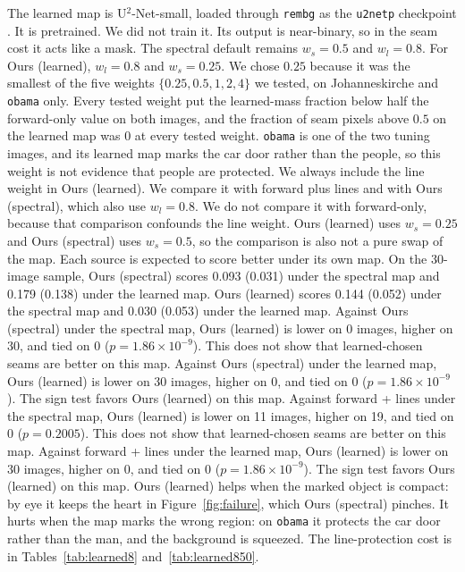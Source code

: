 \documentclass[10pt,twocolumn,letterpaper]{article}
\begin{document}
The learned map is U$^2$-Net-small, loaded through \texttt{rembg} as the \texttt{u2netp} checkpoint \cite{qin2020u2net}.
It is pretrained. We did not train it.
Its output is near-binary, so in the seam cost it acts like a mask.
The spectral default remains $w_s = 0.5$ and $w_l = 0.8$.
For Ours (learned), $w_l = 0.8$ and $w_s = 0.25$.
We chose $0.25$ because it was the smallest of the five weights $\{0.25, 0.5, 1, 2, 4\}$ we tested, on Johanneskirche and \texttt{obama} only.
Every tested weight put the learned-mass fraction below half the forward-only value on both images, and the fraction of seam pixels above $0.5$ on the learned map was 0 at every tested weight.
\texttt{obama} is one of the two tuning images, and its learned map marks the car door rather than the people, so this weight is not evidence that people are protected.
We always include the line weight in Ours (learned).
We compare it with forward plus lines and with Ours (spectral), which also use $w_l = 0.8$.
We do not compare it with forward-only, because that comparison confounds the line weight.
Ours (learned) uses $w_s = 0.25$ and Ours (spectral) uses $w_s = 0.5$, so the comparison is also not a pure swap of the map.
Each source is expected to score better under its own map.
On the 30-image sample, Ours (spectral) scores 0.093 (0.031) under the spectral map and 0.179 (0.138) under the learned map.
Ours (learned) scores 0.144 (0.052) under the spectral map and 0.030 (0.053) under the learned map.
Against Ours (spectral) under the spectral map, Ours (learned) is lower on 0 images, higher on 30, and tied on 0 ($p = 1.86 \times 10^{-9}$). This does not show that learned-chosen seams are better on this map. Against Ours (spectral) under the learned map, Ours (learned) is lower on 30 images, higher on 0, and tied on 0 ($p = 1.86 \times 10^{-9}$). The sign test favors Ours (learned) on this map. Against forward + lines under the spectral map, Ours (learned) is lower on 11 images, higher on 19, and tied on 0 ($p = 0.2005$). This does not show that learned-chosen seams are better on this map. Against forward + lines under the learned map, Ours (learned) is lower on 30 images, higher on 0, and tied on 0 ($p = 1.86 \times 10^{-9}$). The sign test favors Ours (learned) on this map.
Ours (learned) helps when the marked object is compact: by eye it keeps the heart in Figure~\ref{fig:failure}, which Ours (spectral) pinches.
It hurts when the map marks the wrong region: on \texttt{obama} it protects the car door rather than the man, and the background is squeezed.
The line-protection cost is in Tables~\ref{tab:learned8} and~\ref{tab:learned850}.
\end{document}
